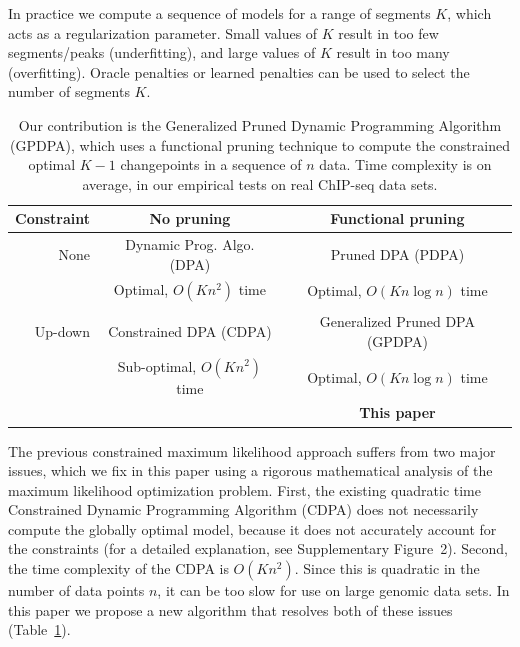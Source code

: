 \documentclass[aoas]{imsart}
\begin{document}
In practice we compute a sequence of models for a range
of segments $K$, which acts as a regularization parameter. Small
values of $K$ result in too few segments/peaks (underfitting), and
large values of $K$ result in too many (overfitting). Oracle penalties
\citep{cleynen2013segmentation} or learned penalties
\citep{HOCKING-penalties} can be used to select the number of segments
$K$.

\begin{table}[t!]
  \centering
  \begin{tabular}{r|c|c}
    Constraint & No pruning & Functional pruning \\
    \hline
    None & Dynamic Prog. Algo. (DPA) & Pruned DPA (PDPA) \\
    & Optimal, $O(Kn^2)$ time & Optimal, $O(Kn\log n)$ time\\
    & \citet{segment-neighborhood}     & \citet{pruned-dp, phd-johnson} \\
    \hline
    Up-down & Constrained DPA (CDPA) & Generalized Pruned DPA (GPDPA) \\
    & Sub-optimal, $O(Kn^2)$ time & Optimal, $O(Kn\log n)$ time\\
    & \citet{HOCKING-PeakSeg} & \textbf{This paper} \\
    \hline
  \end{tabular}
  \caption{Our contribution is 
the Generalized Pruned Dynamic Programming Algorithm (GPDPA), 
 which uses a functional pruning technique 
    to compute the constrained optimal $K-1$ changepoints 
in a sequence of $n$ data. 
Time complexity is on average, 
in our empirical tests on real ChIP-seq data sets.}
\label{tab:contribution}
\end{table}

The previous constrained maximum likelihood approach suffers from two
major issues, which we fix in this paper using a rigorous mathematical
analysis of the maximum likelihood optimization problem. First, the
existing quadratic time Constrained Dynamic Programming Algorithm
(CDPA) does not necessarily compute the globally optimal model,
because it does not accurately account for the constraints (for a
detailed explanation, see Supplementary Figure~2). Second, the time
complexity of the CDPA is $O(Kn^2)$. Since this is quadratic in the
number of data points $n$, it can be too slow for use on large genomic
data sets. In this paper we propose a new algorithm that resolves both
of these issues (Table~\ref{tab:contribution}).
\end{document}
